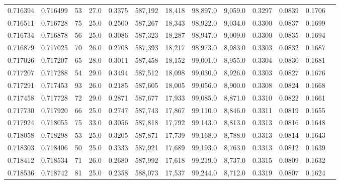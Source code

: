 \begin{tabular}{rrrrrrrrrrrrr}
0.716394 & 0.716499 &    53 & 27.0 &                                     0.3375 & 587,192 &  18,418 &  98,897.0 &   9,059.0 & 0.3297 & 0.0839 & 0.1706 \\
0.716511 & 0.716728 &    75 & 25.0 &                                     0.2500 & 587,267 &  18,343 &  98,922.0 &   9,034.0 & 0.3300 & 0.0837 & 0.1699 \\
0.716734 & 0.716878 &    56 & 25.0 &                                     0.3086 & 587,323 &  18,287 &  98,947.0 &   9,009.0 & 0.3300 & 0.0835 & 0.1694 \\
0.716879 & 0.717025 &    70 & 26.0 &                                     0.2708 & 587,393 &  18,217 &  98,973.0 &   8,983.0 & 0.3303 & 0.0832 & 0.1687 \\
0.717026 & 0.717207 &    65 & 28.0 &                                     0.3011 & 587,458 &  18,152 &  99,001.0 &   8,955.0 & 0.3304 & 0.0830 & 0.1681 \\
0.717207 & 0.717288 &    54 & 29.0 &                                     0.3494 & 587,512 &  18,098 &  99,030.0 &   8,926.0 & 0.3303 & 0.0827 & 0.1676 \\
0.717291 & 0.717453 &    93 & 26.0 &                                     0.2185 & 587,605 &  18,005 &  99,056.0 &   8,900.0 & 0.3308 & 0.0824 & 0.1668 \\
0.717458 & 0.717728 &    72 & 29.0 &                                     0.2871 & 587,677 &  17,933 &  99,085.0 &   8,871.0 & 0.3310 & 0.0822 & 0.1661 \\
0.717730 & 0.717920 &    66 & 25.0 &                                     0.2747 & 587,743 &  17,867 &  99,110.0 &   8,846.0 & 0.3311 & 0.0819 & 0.1655 \\
0.717924 & 0.718055 &    75 & 33.0 &                                     0.3056 & 587,818 &  17,792 &  99,143.0 &   8,813.0 & 0.3313 & 0.0816 & 0.1648 \\
0.718058 & 0.718298 &    53 & 25.0 &                                     0.3205 & 587,871 &  17,739 &  99,168.0 &   8,788.0 & 0.3313 & 0.0814 & 0.1643 \\
0.718303 & 0.718406 &    50 & 25.0 &                                     0.3333 & 587,921 &  17,689 &  99,193.0 &   8,763.0 & 0.3313 & 0.0812 & 0.1639 \\
0.718412 & 0.718534 &    71 & 26.0 &                                     0.2680 & 587,992 &  17,618 &  99,219.0 &   8,737.0 & 0.3315 & 0.0809 & 0.1632 \\
0.718536 & 0.718742 &    81 & 25.0 &                                     0.2358 & 588,073 &  17,537 &  99,244.0 &   8,712.0 & 0.3319 & 0.0807 & 0.1624 \\

\end{tabular}
